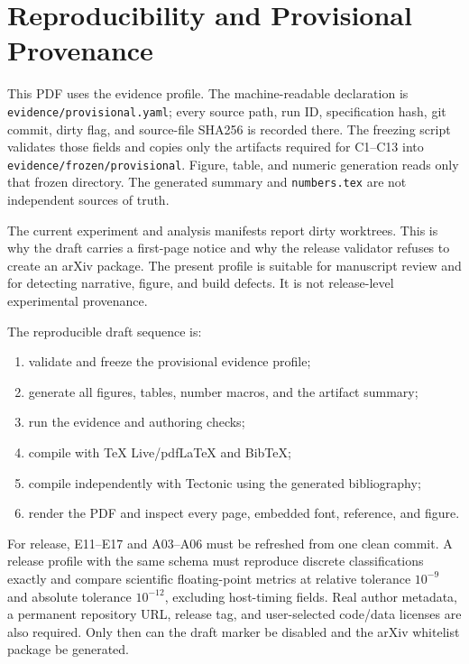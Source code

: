 \section{Reproducibility and Provisional Provenance}
\label{app:reproducibility}

This PDF uses the \texttt{\EvidenceProfile} evidence profile. The machine-readable declaration is \texttt{evidence/provisional.yaml}; every source path, run ID, specification hash, git commit, dirty flag, and source-file SHA256 is recorded there. The freezing script validates those fields and copies only the artifacts required for C1--C13 into \texttt{evidence/frozen/provisional}. Figure, table, and numeric generation reads only that frozen directory. The generated summary and \texttt{numbers.tex} are not independent sources of truth.

The current experiment and analysis manifests report dirty worktrees. This is why the draft carries a first-page notice and why the release validator refuses to create an arXiv package. The present profile is suitable for manuscript review and for detecting narrative, figure, and build defects. It is not release-level experimental provenance.

The reproducible draft sequence is:
\begin{enumerate}[leftmargin=*,itemsep=1pt]
 \item validate and freeze the provisional evidence profile;
 \item generate all figures, tables, number macros, and the artifact summary;
 \item run the evidence and authoring checks;
 \item compile with TeX Live/pdfLaTeX and BibTeX;
 \item compile independently with Tectonic using the generated bibliography;
 \item render the PDF and inspect every page, embedded font, reference, and figure.
\end{enumerate}

For release, E11--E17 and A03--A06 must be refreshed from one clean commit. A release profile with the same schema must reproduce discrete classifications exactly and compare scientific floating-point metrics at relative tolerance $10^{-9}$ and absolute tolerance $10^{-12}$, excluding host-timing fields. Real author metadata, a permanent repository URL, release tag, and user-selected code/data licenses are also required. Only then can the draft marker be disabled and the arXiv whitelist package be generated.


